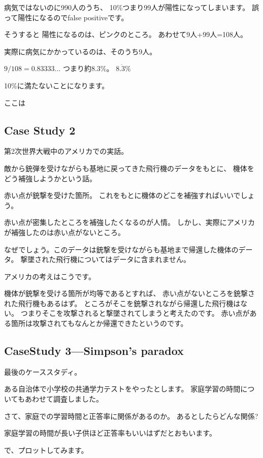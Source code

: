 \documentclass[uplatex,jis2004,dvipdfmx,12pt]{jsarticle}
\begin{document}
病気ではないのに990人のうち、
10\%つまり99人が陽性になってしまいます。
誤って陽性になるのでfalse positiveです。

そうすると
陽性になるのは、ピンクのところ。
あわせて9人+99人=108人。

実際に病気にかかっているのは、そのうち9人。

$9/108=0.83333\dots$
つまり約8.3\%。
$8.\dot{3}\%$

10\%に満たないことになります。


ここは



\subsection{Case Study 2}

第2次世界大戦中のアメリカでの実話。

敵から銃弾を受けながらも基地に戻ってきた飛行機のデータをもとに、
機体をどう補強しようかという話。

赤い点が銃撃を受けた箇所。
これをもとに機体のどこを補強すればいいでしょう。

赤い点が密集したところを補強したくなるのが人情。
しかし、実際にアメリカが補強したのは赤い点がないところ。

なぜでしょう。このデータは銃撃を受けながらも基地まで帰還した機体のデータ。
撃墜された飛行機についてはデータに含まれません。

アメリカの考えはこうです。

機体が銃撃を受ける箇所が均等であるとすれば、
赤い点がないところを銃撃された飛行機もあるはず。
ところがそこを銃撃されながら帰還した飛行機はない。
つまりそこを攻撃されると撃墜されてしまうと考えたのです。
赤い点がある箇所は攻撃されてもなんとか帰還できたというのです。





\subsection{CaseStudy 3---Simpson's paradox}
最後のケーススタディ。

ある自治体で小学校の共通学力テストをやったとします。
家庭学習の時間についてもあわせて調査しました。


さて、家庭での学習時間と正答率に関係があるのか。
あるとしたらどんな関係?

家庭学習の時間が長い子供ほど正答率もいいはずだとおもいます。

で、プロットしてみます。
\end{document}
